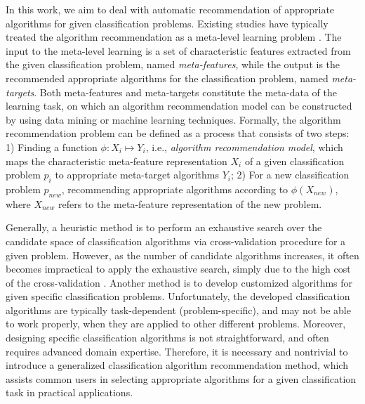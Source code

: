 \documentclass[acmsmall]{acmart}
\begin{document}
In this work, we aim to deal with automatic recommendation of appropriate algorithms for given classification problems.
Existing studies have typically treated the algorithm recommendation as a meta-level learning problem \cite{rice1975algorithm,smith2008cross}.
The input to the meta-level learning is a set of characteristic features extracted from the given classification problem, named \textit{meta-features},
while the output is the recommended appropriate algorithms for the classification problem, named \textit{meta-targets}.
Both meta-features and meta-targets constitute the meta-data of the learning task,
on which an algorithm recommendation model can be constructed by using data mining or machine learning techniques.
Formally,
the algorithm recommendation problem can be defined as a process that consists of two steps:
1) Finding a function $\phi: X_i \mapsto Y_i$, i.e., \textit{algorithm recommendation model},
which maps the characteristic meta-feature representation $X_i$ of a given classification problem $p_i$ to appropriate meta-target algorithms $Y_i$;
2) For a new classification problem $p_{new}$, recommending appropriate algorithms according to $\phi(X_{new})$, where $X_{new}$ refers to the meta-feature representation of the new problem.







Generally,
a heuristic method is to perform an exhaustive search over the candidate space of classification algorithms via cross-validation procedure for a given problem.
However, as the number of candidate algorithms increases, it often becomes impractical to apply the exhaustive search,
simply due to the high cost of the cross-validation \cite{song2012automatic}.
Another method is to develop customized algorithms for given specific classification problems.
Unfortunately,
the developed classification algorithms are typically task-dependent (problem-specific), and may not be able to work properly, when they are applied to other different problems.
Moreover, designing specific classification algorithms is not straightforward, and often requires advanced domain expertise.
Therefore, it is necessary and nontrivial to introduce a generalized classification algorithm recommendation method,
which assists common users in selecting appropriate algorithms for a given classification task in practical applications.
\end{document}
